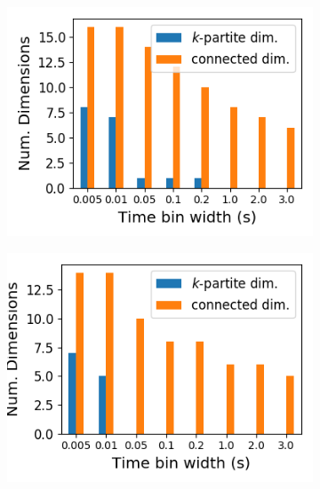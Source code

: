   \begin{figure}[h]
    \begin{subfigure}[h]{0.5\linewidth}
      \centering
      \includegraphics[width=\linewidth]{figures/eight_probe/Krebs_rectified_total_structure_dims.png}
      \label{fig:Krebs_rectified_total_structure_dims}
    \end{subfigure}
    \begin{subfigure}[h]{0.5\linewidth}
      \centering
      \includegraphics[width=\linewidth]{figures/eight_probe/Waksman_rectified_total_structure_dims.png}
      \label{fig:Waksman_rectified_total_structure_dims}
    \end{subfigure}
    \begin{subfigure}[h]{0.5\linewidth}

\end{subfigure}
\end{figure}
